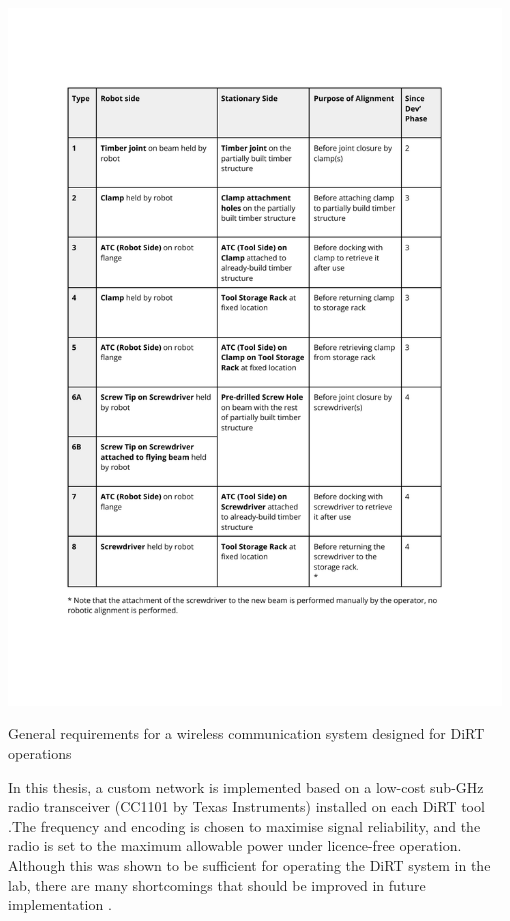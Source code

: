 \begin{table}[h!]
    \includegraphics[page=11, trim=25.4mm 70mm 25.4mm 33mm, clip, width=0.98\textwidth]{tables/Tables in Chapter 9 to 11.pdf}
    \caption{General requirements for a wireless communication system designed for DiRT operations}
    \label{table:dirt-wireless-specifications}
\end{table}


In this thesis, a custom network is implemented based on a low-cost sub-GHz radio transceiver (CC1101 by Texas Instruments) installed on each DiRT tool .The frequency and encoding is chosen to maximise signal reliability, and the radio is set to the maximum allowable power under licence-free operation. Although this was shown to be sufficient for operating the DiRT system in the lab, there are many shortcomings that should be improved in future implementation .

